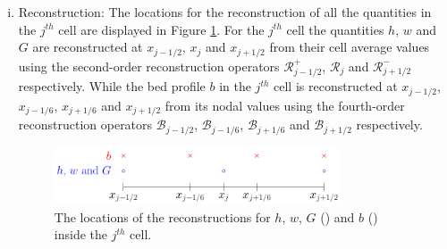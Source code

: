 \begin{enumerate}[(i)]
	\item Reconstruction: The locations for the reconstruction of all the quantities in the $j^{th}$ cell are displayed in Figure \ref{fig:ReconLocs}. For the $j^{th}$ cell the quantities $h$, $w$ and $G$ are reconstructed at $x_{j-1/2}$, $x_{j}$ and $x_{j+1/2}$ from their cell average values using the second-order reconstruction operators $\mathcal{R}^+_{j-1/2}$, $\mathcal{R}_{j}$ and $\mathcal{R}^-_{j+1/2}$ respectively. While the bed profile $b$ in the $j^{th}$ cell is reconstructed at $x_{j-1/2}$, $x_{j-1/6}$, $x_{j+1/6}$ and $x_{j+1/2}$ from its nodal values using the fourth-order reconstruction operators $\mathcal{B}_{j-1/2}$, $\mathcal{B}_{j-1/6}$, $\mathcal{B}_{j+1/6}$ and $\mathcal{B}_{j+1/2}$ respectively. 
	\begin{figure}
		\centering
		\includegraphics[width=0.8\textwidth]{./chp3/figures/FEVMRecon.pdf}
		\caption{The locations of the reconstructions for $h$, $w$, $G$ () and $b$ () inside the $j^{th}$ cell.}
		\label{fig:ReconLocs}
	\end{figure}
	

\end{enumerate}
